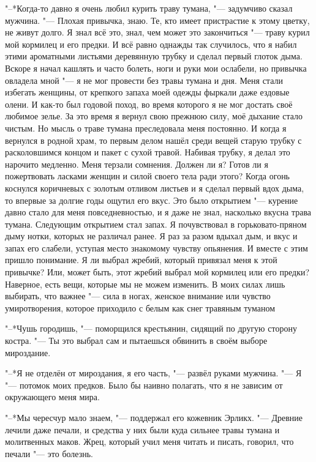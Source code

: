 \documentclass[a4paper,10pt,fleqn]{book}
\newcommand{\ldotst}{\so{...}\xspace}
\begin{document}
"--*Когда-то давно я очень любил курить траву тумана, "--- задумчиво сказал мужчина.
"--- Плохая привычка, знаю.
Те, кто имеет пристрастие к этому цветку, не живут долго.
Я знал всё это, знал, чем может это закончиться "--- траву курил мой кормилец и его предки.
И всё равно однажды так случилось, что я набил этими ароматными листьями деревянную трубку и сделал первый глоток дыма.
Вскоре я начал кашлять и часто болеть, ноги и руки мои ослабели, но привычка овладела мной "--- я не мог провести без травы тумана и дня.
Меня стали избегать женщины, от крепкого запаха моей одежды фыркали даже ездовые олени.
И как-то был годовой поход, во время которого я не мог достать своё любимое зелье.
За это время я вернул свою прежнюю силу, моё дыхание стало чистым.
Но мысль о траве тумана преследовала меня постоянно.
И когда я вернулся в родной храм, то первым делом нашёл среди вещей старую трубку с расколовшимся концом и пакет с сухой травой.
Набивая трубку, я делал это нарочито медленно.
Меня терзали сомнения.
Должен ли я?
Готов ли я пожертвовать ласками женщин и силой своего тела ради этого?
Когда огонь коснулся коричневых с золотым отливом листьев и я сделал первый вдох дыма, то впервые за долгие годы ощутил его вкус.
Это было открытием "--- курение давно стало для меня повседневностью, и я даже не знал, насколько вкусна трава тумана.
Следующим открытием стал запах.
Я почувствовал в горьковато-пряном дыму нотки, которых не различал ранее.
Я раз за разом вдыхал дым, и вкус и запах его слабели, уступая место знакомому чувству опьянения.
И вместе с этим пришло понимание.
Я ли выбрал жребий, который привязал меня к этой привычке?
Или, может быть, этот жребий выбрал мой кормилец или его предки?
Наверное, есть вещи, которые мы не можем изменить.
В моих силах лишь выбирать, что важнее "--- сила в ногах, женское внимание или чувство умиротворения, которое приходило с белым как снег травяным туманом\ldotst

"--*Чушь городишь, "--- поморщился крестьянин, сидящий по другую сторону костра.
"--- Ты это выбрал сам и пытаешься обвинить в своём выборе мироздание.

"--*Я не отделён от мироздания, я его часть, "--- развёл руками мужчина.
"--- Я "--- потомок моих предков.
Было бы наивно полагать, что я не зависим от окружающего меня мира.

"--*Мы чересчур мало знаем, "--- поддержал его кожевник Эрликх.
"--- Древние лечили даже печали, и средства у них были куда сильнее травы тумана и молитвенных маков.
Жрец, который учил меня читать и писать, говорил, что печали "--- это болезнь.
\end{document}
